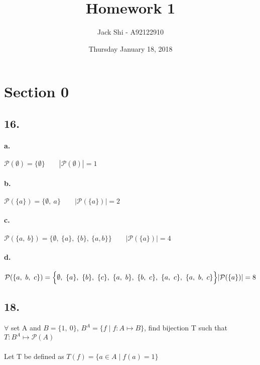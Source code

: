 \documentclass{article}
\title{Homework 1}
\author{Jack Shi - A92122910}
\date{Thursday January 18, 2018}
\begin{document}
\maketitle
\section*{Section 0}
\subsection*{16.}
	\paragraph{a.}
	$\mathcal{P}(\emptyset)=\Big\{\emptyset\Big\} \qquad
	|\mathcal{P}(\emptyset)|=1$
	\paragraph{b.}
	$\mathcal{P}(\{a\})=\Big\{\emptyset,\ a\Big\} \qquad
	|\mathcal{P}(\{a\})|= 2$
	\paragraph{c.}
	$\mathcal{P}(\{a,\ b\})=\Big\{\emptyset,\ \{a\},\ \{b\},\ \{a, b\}\Big\} \qquad
	|\mathcal{P}(\{a\})|= 4$
	\paragraph{d.}
	$\mathcal{P}(\{a,\ b,\ c\})=\Big\{\emptyset,\ \{a\},\ \{b\},\ \{c\},
	\ \{a,\ b\},\ \{b,\ c\},\ \{a,\ c\},
	\ \{a,\ b,\ c\}\Big\} \\
	|\mathcal{P}(\{a\})|= 8$

\subsection*{18.}
	$\forall$ set A and $B=\{1,\ 0\}$, $B^A=\{f\mid f:A\mapsto B\}$, find bijection T such
	that $T:B^A \mapsto \mathcal{P}(A)$\\ \\
	Let T be defined as $T(f)=\{a \in A\mid f(a)=1\}$
\end{document}
